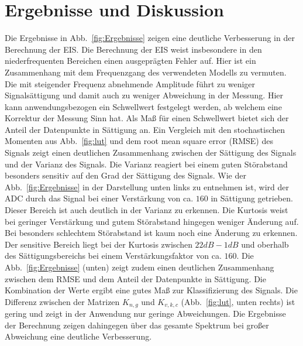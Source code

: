 \section{Ergebnisse und Diskussion}
Die Ergebnisse in Abb.~\ref{fig:Ergebnisse} zeigen eine deutliche Verbesserung in der Berechnung der EIS.
Die Berechnung der EIS weist insbesondere in den niederfrequenten Bereichen einen ausgeprägten Fehler auf. Hier ist ein Zusammenhang mit dem Frequenzgang des verwendeten Modells zu vermuten. Die mit steigender Frequenz abnehmende Amplitude führt zu weniger Signalsättigung und damit auch zu weniger Abweichung in der Messung. Hier kann anwendungsbezogen ein Schwellwert festgelegt werden, ab welchem eine Korrektur der Messung Sinn hat. Als Maß für einen Schwellwert bietet sich der Anteil der Datenpunkte in Sättigung an. Ein Vergleich mit den stochastischen Momenten aus Abb.~\ref{fig:lut} und dem root mean square error (RMSE) des Signals zeigt einen deutlichen Zusammenhang zwischen der Sättigung des Signals und der Varianz des Signals. Die Varianz reagiert bei einem guten Störabstand besonders sensitiv auf den Grad der Sättigung des Signals. Wie der Abb.~\ref{fig:Ergebnisse} in der Darstellung unten links zu entnehmen ist, wird der ADC durch das Signal bei einer Verstärkung von ca. $160$ in Sättigung getrieben. Dieser Bereich ist auch deutlich in der Varianz zu erkennen. Die Kurtosis weist bei geringer Verstärkung und gutem Störabstand hingegen weniger Änderung auf. Bei besonders schlechtem Störabstand ist kaum noch eine Änderung zu erkennen. Der sensitive Bereich liegt bei der Kurtosis zwischen $22dB - 1dB$ und oberhalb des Sättigungsbereichs bei einem Verstärkungsfaktor von ca. $160$. Die Abb.~\ref{fig:Ergebnisse} (unten) zeigt zudem einen deutlichen Zusammenhang zwischen dem RMSE und dem Anteil der Datenpunkte in Sättigung. Die Kombination der Werte ergibt eine gutes Maß zur Klassifizierung des Signals. Die Differenz zwischen der Matrizen $K_{n,g}$ und $K_{v,k,c}$ (Abb.~\ref{fig:lut}, unten rechts) ist gering und zeigt in der Anwendung nur geringe Abweichungen. Die Ergebnisse der Berechnung zeigen dahingegen über das gesamte Spektrum bei großer Abweichung eine deutliche Verbesserung. 
